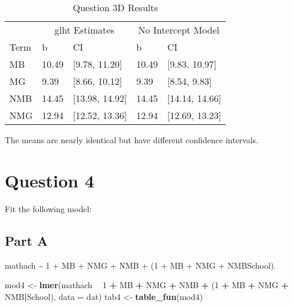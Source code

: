 \documentclass[]{article}
\newenvironment{Shaded}{\begin{snugshade}}{\end{snugshade}}
\newcommand{\KeywordTok}[1]{\textcolor[rgb]{0.13,0.29,0.53}{\textbf{#1}}}
\newcommand{\DataTypeTok}[1]{\textcolor[rgb]{0.13,0.29,0.53}{#1}}
\newcommand{\DecValTok}[1]{\textcolor[rgb]{0.00,0.00,0.81}{#1}}
\newcommand{\StringTok}[1]{\textcolor[rgb]{0.31,0.60,0.02}{#1}}
\newcommand{\OperatorTok}[1]{\textcolor[rgb]{0.81,0.36,0.00}{\textbf{#1}}}
\newcommand{\NormalTok}[1]{#1}
\begin{document}
\begin{table}

\caption{\label{tab:unnamed-chunk-12}Question 3D Results}
\centering
\begin{tabular}[t]{lllll}
\toprule
\multicolumn{1}{c}{ } & \multicolumn{2}{c}{glht Estimates} & \multicolumn{2}{c}{No Intercept Model} \\
\cmidrule(l{2pt}r{2pt}){2-3} \cmidrule(l{2pt}r{2pt}){4-5}
Term & b & CI & b & CI\\
\midrule
MB & 10.49 & [9.78, 11.20] & 10.49 & [9.83, 10.97]\\
MG & 9.39 & [8.66, 10.12] & 9.39 & [8.54, 9.83]\\
NMB & 14.45 & [13.98, 14.92] & 14.45 & [14.14, 14.66]\\
NMG & 12.94 & [12.52, 13.36] & 12.94 & [12.69, 13.23]\\
\bottomrule
\end{tabular}
\end{table}

The means are nearly identical but have different confidence intervals.

\section{Question 4}\label{question-4}

Fit the following model:

\subsection{Part A}\label{part-a-2}

mathach \textasciitilde{} 1 + MB + NMG + NMB + (1 + MB + NMG +
NMB\textbar{}School).

\begin{Shaded}
\begin{Highlighting}[]
\NormalTok{mod4 <-}\StringTok{ }\KeywordTok{lmer}\NormalTok{(mathach }\OperatorTok{~}\StringTok{ }\DecValTok{1} \OperatorTok{+}\StringTok{ }\NormalTok{MB }\OperatorTok{+}\StringTok{ }\NormalTok{NMG }\OperatorTok{+}\StringTok{ }\NormalTok{NMB }\OperatorTok{+}\StringTok{ }\NormalTok{(}\DecValTok{1} \OperatorTok{+}\StringTok{ }\NormalTok{MB }\OperatorTok{+}\StringTok{ }\NormalTok{NMG }\OperatorTok{+}\StringTok{ }\NormalTok{NMB}\OperatorTok{|}\NormalTok{School), }\DataTypeTok{data =}\NormalTok{ dat)}
\NormalTok{tab4 <-}\StringTok{ }\KeywordTok{table_fun}\NormalTok{(mod4)}
\end{Highlighting}
\end{Shaded}
\end{document}
